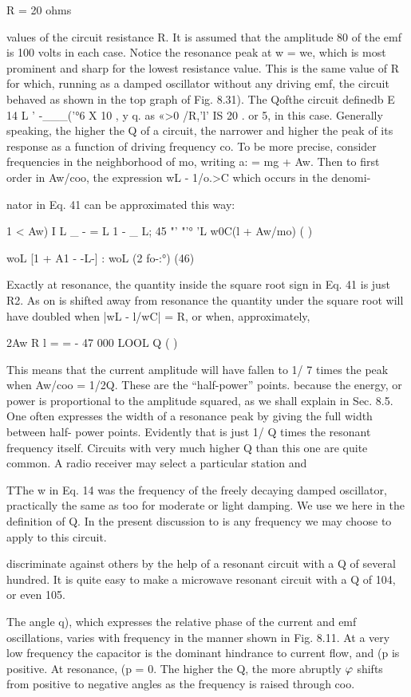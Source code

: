R = 20 ohms

values of the circuit resistance R. It is assumed that the amplitude 80
of the emf is 100 volts in each case. Notice the resonance peak at
w = we, which is most prominent and sharp for the lowest resistance
value. This is the same value of R for which, running as a damped
oscillator without any driving emf, the circuit behaved as shown in
the top graph of Fig. 8.31).
The Qofthe circuit definedb E 14 L ' -___('°6 X 10%
, y q. as «>0 /R,'l' IS 20 .
or 5, in this case. Generally speaking, the higher the Q of a circuit,
the narrower and higher the peak of its response as a function of
driving frequency co. To be more precise, consider frequencies in
the neighborhood of mo, writing a: = mg + Aw. Then to first order
in Aw/coo, the expression wL - 1/o.>C which occurs in the denomi-

nator in Eq. 41 can be approximated this way:

1 < Aw) I
L _ - = L 1 - _ L; 45
"' "'° 'L w0C(l + Aw/mo) ( )

woL [1 + A1 - -L-] : woL (2 fo-:°) (46)

Exactly at resonance, the quantity inside the square root sign in
Eq. 41 is just R2. As on is shifted away from resonance the quantity
under the square root will have doubled when |wL - l/wC| = R,
or when, approximately,

2Aw R l
= = - 47
000 LOOL Q ( )

This means that the current amplitude will have fallen to 1/ \/7 times
the peak when Aw/coo = 1/2Q. These are the ``half-power'' points.
because the energy, or power is proportional to the amplitude
squared, as we shall explain in Sec. 8.5. One often expresses the
width of a resonance peak by giving the full width between half-
power points. Evidently that is just 1/ Q times the resonant frequency
itself. Circuits with very much higher Q than this one are
quite common. A radio receiver may select a particular station and

TThe w in Eq. 14 was the frequency of the freely decaying damped oscillator, practically
the same as too for moderate or light damping. We use we here in the definition
of Q. In the present discussion to is any frequency we may choose to apply to this circuit.

discriminate against others by the help of a resonant circuit with a Q
of several hundred. It is quite easy to make a microwave resonant
circuit with a Q of 104, or even 105.

The angle q), which expresses the relative phase of the current and
emf oscillations, varies with frequency in the manner shown in
Fig. 8.11. At a very low frequency the capacitor is the dominant
hindrance to current flow, and (p is positive. At resonance, (p = 0.
The higher the Q, the more abruptly $\varphi$ shifts from positive to negative
angles as the frequency is raised through coo.

